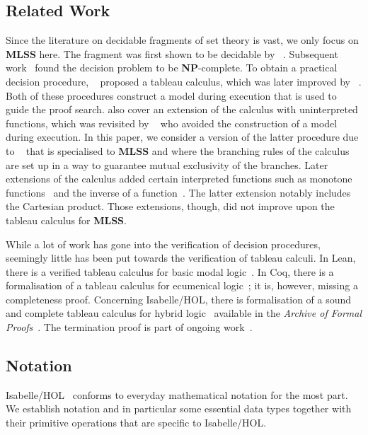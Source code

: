 \documentclass[runningheads]{llncs}
\newcommand{\MLSS}{\textbf{MLSS}}
\begin{document}
\subsection{Related Work}
Since the literature on decidable fragments of set theory is vast, we only focus on \MLSS{} here.
The fragment was first shown to be decidable by \citeauthor{mlss_first}~\cite{mlss_first}.
Subsequent work~\cite{mlss_np} found the decision problem to be \textbf{NP}-complete.
To obtain a practical decision procedure, \citeauthor{mlss_first_tableau}~\cite{mlss_first_tableau} proposed a tableau calculus, which was later improved by \citeauthor{tableau_quantifier_free}~\cite{tableau_quantifier_free}.
Both of these procedures construct a model during execution that is used to guide the proof search.
\citeauthor{tableau_quantifier_free} also cover an extension of the calculus with uninterpreted functions, which was revisited by \citeauthor{mlss_quantification}~\cite{mlss_quantification} who avoided the construction of a model during execution.
In this paper, we consider a version of the latter procedure due to \citeauthor{new_fast_tableau}~\cite{new_fast_tableau} that is specialised to \MLSS{} and where the branching rules of the calculus are set up in a way to guarantee mutual exclusivity of the branches.
Later extensions of the calculus added certain interpreted functions such as monotone functions~\cite{mlss_monotone_functions} and the inverse of a function~\cite{mlss_cartesian_map}.
The latter extension notably includes the Cartesian product.
Those extensions, though, did not improve upon the tableau calculus for \MLSS{}.

While a lot of work has gone into the verification of decision procedures, seemingly little has been put towards the verification of tableau calculi.
In Lean, there is a verified tableau calculus for basic modal logic~\cite{modal_logic_lean}.
In Coq, there is a formalisation of a tableau calculus for ecumenical logic~\cite{ecumenical_logic}; it is, however, missing a completeness proof.
Concerning Isabelle/HOL, there is formalisation of a sound and complete tableau calculus for hybrid logic~\cite{hybrid_logic} available in the \textit{Archive of Formal Proofs}~\cite{hybrid_logic_afp}.
The termination proof is part of ongoing work~\cite{hybrid_logic_workshop}.

\subsection{Notation}
Isabelle/HOL~\cite{isabelle} conforms to everyday mathematical notation for the most part.
We establish notation and in particular some essential data types together with their primitive operations that are specific to Isabelle/HOL.
\end{document}
